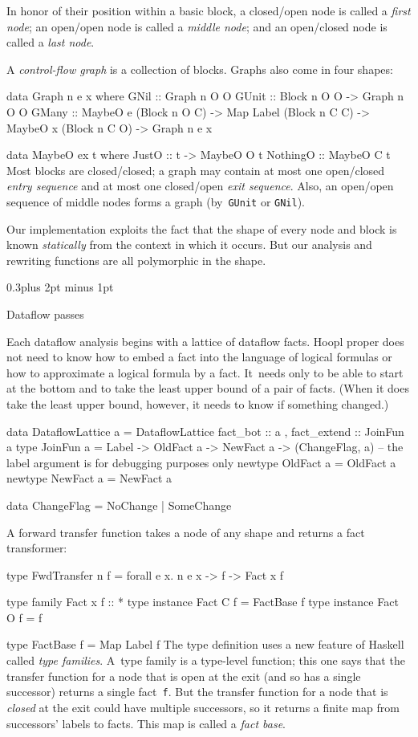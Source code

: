 \documentclass[twocolumn]{article}
\makeatletter
\newenvironment{code}{\par\unskip\kern-6pt \small\verbatim}{\endverbatim}
\newenvironment{smallcode}{\par\unskip\footnotesize\verbatim}{\endverbatim}
\newcommand\mysection[1]{%
  \par
  \vskip 0.5\baselineskip plus 2pt minus 1pt
  \noindent{\raggedright\textbf{#1}}
  \par
  \vskip 0.3\baselineskip plus 2pt minus 1pt
  \@afterindentfalse
}
\renewcommand\mysection[1]{%
  \@startsection{section}{1}{\z@}{-0.5\baselineskip plus -2pt minus -1pt}%
                                   {0.3\baselineskip plus 2pt minus 1pt}%
           {\normalfont\raggedright\bfseries}}
\makeatother
\begin{document}
In honor of their position within a basic block, 
a closed/open node is called a \emph{first node}; 
an open/open node is called a \emph{middle node}; 
and
an open/closed node is called a \emph{last node}.


A \emph{control-flow graph} is a collection of blocks.
Graphs also come in four shapes:
\begin{code}
data Graph n e x where
  GNil  :: Graph n O O
  GUnit :: Block n O O -> Graph n O O
  GMany :: MaybeO e  (Block n O C) 
        -> Map Label (Block n C C)
        -> MaybeO x  (Block n C O)
        -> Graph n e x

data MaybeO ex t where
  JustO    :: t -> MaybeO O t
  NothingO ::      MaybeO C t
\end{code}
Most blocks are closed/closed; a graph may contain at most one
open/closed \emph{entry sequence} and at most one closed/open
\emph{exit sequence}.
Also, an open/open sequence of middle nodes forms a graph
(by~\texttt{GUnit} or \texttt{GNil}).



Our implementation exploits the fact that the shape of every node and
block is known \emph{statically} from the context in which it occurs.
But our analysis and rewriting functions are all polymorphic in the
shape.

\mysection*{Dataflow passes}

Each dataflow analysis begins with a lattice of dataflow facts.
Hoopl proper does not need to know how to embed a fact into the
language of logical formulas or how to approximate a logical formula
by a fact.
It~needs only to be able to start at the bottom and to take the least
upper bound of a pair of facts.
(When it does take the least upper bound, however, it needs to know if
something changed.)
\begin{smallcode}
data DataflowLattice a = DataflowLattice  
 { fact_bot        :: a
 , fact_extend     :: JoinFun a
 }
type JoinFun a
  = Label -> OldFact a -> NewFact a -> (ChangeFlag, a)
  -- the label argument is for debugging purposes only
newtype OldFact a = OldFact a
newtype NewFact a = NewFact a

data ChangeFlag = NoChange | SomeChange
\end{smallcode}

A forward transfer function takes a node of any shape and returns a
fact transformer:
\begin{code}
type FwdTransfer n f 
  = forall e x. n e x -> f -> Fact x f 

type family   Fact x f :: *
type instance Fact C f = FactBase f
type instance Fact O f = f

type FactBase f = Map Label f
\end{code}
The type definition uses a new feature of Haskell called \emph{type
  families}.
A~type family is a type-level function; this one says that the
  transfer function for a node that is open at the exit (and so has a
  single successor) returns a single fact~\texttt{f}.
But the transfer function for a node that is \emph{closed} at the exit
  could have multiple successors, so it returns a finite map from
  successors' labels to facts.
This map is called a \emph{fact base}.
\end{document}
